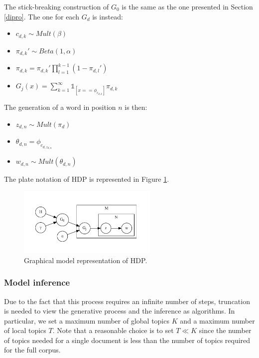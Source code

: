 The stick-breaking construction of $G_0$ is the same as the one presented in Section \ref{dipro}.
The one for each $G_d$ is instead:
\begin{itemize}
    \item $c_{d,k} \sim \mathit{Mult}(\beta)$
    \item $\pi_{d,k}' \sim \mathit{Beta(1, \alpha)}$
    \item $\pi_{d,k} = \pi_{d,k}' \prod_{l=1}^{k-1} (1 - \pi_{d,l}')$
    \item $G_j(x) = \sum_{k=1}^{\infty} \mathbb{1}_{[x == \phi_{c_{d,k}}]} \pi_{d,k}$
\end{itemize}

The generation of a word in position $n$ is then:
\begin{itemize}
    \item $z_{d,n} \sim \mathit{Mult}(\pi_d)$
    \item $\theta_{d,n} = \phi_{c_{d,z_{d,n}}}$
    \item $w_{d,n} \sim \mathit{Mult}(\theta_{d,n})$
\end{itemize}

The plate notation of HDP is represented in Figure \ref{fig:hdp}.

\begin{figure}[h]
    \centering
    \includegraphics[width=0.6\textwidth]{images/hdp.pdf}
    \caption{Graphical model representation of HDP.}
    \label{fig:hdp}
\end{figure}

\subsubsection{Model inference}
Due to the fact that this process requires an infinite number of steps,
truncation is needed to view the generative process and the inference as algorithms.
In particular, we set a maximum number of global topics $K$ and a maximum number of local topics $T$.
Note that a reasonable choice is to set $T \ll K$ since the number of topics needed for a single document is
less than the number of topics required for the full corpus.

